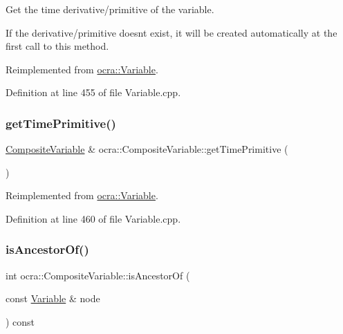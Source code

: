 Get the time derivative/primitive of the variable. 

If the derivative/primitive doesn\textquotesingle{}t exist, it will be created automatically at the first call to this method. 

Reimplemented from \hyperlink{classocra_1_1Variable_a06ee384364d5c6bd1ea4bc4b38d6268c}{ocra\+::\+Variable}.



Definition at line 455 of file Variable.\+cpp.

\hypertarget{classocra_1_1CompositeVariable_a7870c51e9904734593d7990033a7cca4}{}\label{classocra_1_1CompositeVariable_a7870c51e9904734593d7990033a7cca4} 
\subsubsection{\texorpdfstring{get\+Time\+Primitive()}{getTimePrimitive()}}
{\footnotesize\ttfamily \hyperlink{classocra_1_1CompositeVariable}{Composite\+Variable} \& ocra\+::\+Composite\+Variable\+::get\+Time\+Primitive (\begin{DoxyParamCaption}{ }\end{DoxyParamCaption})\hspace{0.3cm}{\ttfamily [virtual]}}



Reimplemented from \hyperlink{classocra_1_1Variable_aca32d63e60dc79de340b2f122dad0dc5}{ocra\+::\+Variable}.



Definition at line 460 of file Variable.\+cpp.

\hypertarget{classocra_1_1CompositeVariable_a6601ac71bdd683d06a7a6bfe4fa7252c}{}\label{classocra_1_1CompositeVariable_a6601ac71bdd683d06a7a6bfe4fa7252c} 
\subsubsection{\texorpdfstring{is\+Ancestor\+Of()}{isAncestorOf()}}
{\footnotesize\ttfamily int ocra\+::\+Composite\+Variable\+::is\+Ancestor\+Of (\begin{DoxyParamCaption}\item[{const \hyperlink{classocra_1_1Variable}{Variable} \&}]{node }\end{DoxyParamCaption}) const\hspace{0.3cm}{\ttfamily [virtual]}}



